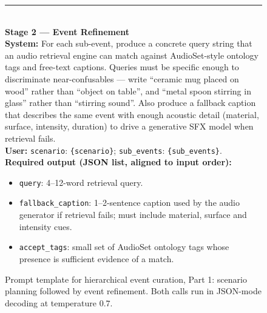\documentclass{article}
\begin{document}
\begin{figure}[H]
\begin{tcolorbox}
\rule{\linewidth}{0.4pt}\\[2pt]

\textbf{Stage 2 --- Event Refinement}\\[1pt]
\textbf{System:} For each sub-event, produce a concrete query string
that an audio retrieval engine can match against AudioSet-style ontology
tags and free-text captions. Queries must be specific enough to
discriminate near-confusables --- write ``ceramic mug placed on wood''
rather than ``object on table'', and ``metal spoon stirring in glass''
rather than ``stirring sound''. Also produce a fallback caption that
describes the same event with enough acoustic detail (material, surface,
intensity, duration) to drive a generative SFX model when retrieval
fails.\\[2pt]
\textbf{User:} \texttt{scenario}: \verb|{scenario}|;\quad
\texttt{sub\_events}: \verb|{sub_events}|.\\[2pt]
\textbf{Required output (JSON list, aligned to input order):}
\begin{itemize}\setlength\itemsep{0pt}\setlength\topsep{0pt}
  \item \texttt{query}: 4--12-word retrieval query.
  \item \texttt{fallback\_caption}: 1--2-sentence caption used by the
        audio generator if retrieval fails; must include material,
        surface and intensity cues.
  \item \texttt{accept\_tags}: small set of AudioSet ontology tags whose
        presence is sufficient evidence of a match.
\end{itemize}
\end{tcolorbox}
\caption{Prompt template for hierarchical event curation, Part 1:
scenario planning followed by event refinement. Both calls run in
JSON-mode decoding at temperature $0.7$.}
\label{prompt:curation-p1}
\end{figure}
\end{document}

